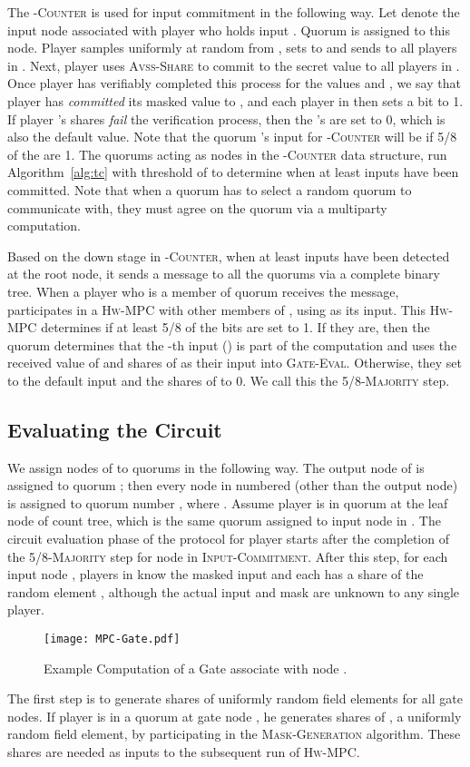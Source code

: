 \documentclass[10pt]{llncs}
\newcommand{\thresh}{5/8\xspace}
\newcommand{\done}{\xspace}
\newcommand{\vssSh}{\textsc{Avss-Share}\xspace}
\newcommand{\hw}{\textsc{Hw-MPC}\xspace}
\newcommand{\tc}{\textsc{-Counter}\xspace}
\newcommand{\ic}{\textsc{Input-Commitment}\xspace}
\newcommand{\gm}{\textsc{Mask-Generation}\xspace}
\newcommand{\gcomp}{\textsc{Gate-Eval}\xspace}
\newcommand{\maj}{\thresh-\textsc{Majority}\xspace}
\newcommand{\ct}{count tree\xspace}
\begin{document}
The \tc is used for input commitment in the following way.
Let  denote the input node associated with player  who holds input 
. Quorum  is assigned to this node. 
Player   samples   uniformly at random from ,
sets  to  and sends
 to all players in .  Next, player  uses \vssSh to 
commit to the secret value  to all
players in .  Once player  has verifiably completed this
process for the values  and , we say that player
 has \emph{committed} its masked value to , and each
player  in  then sets a bit  to 1. If player
's shares \emph{fail} the verification process, then the
's are set to 0, which is also the default value. 
Note that the quorum 's input for \tc will be  if \thresh 
of the 
 are 1. The
quorums acting as nodes in the \tc data structure, run Algorithm~\ref{alg:tc} 
with threshold of  to determine when at least
 inputs have been committed. Note that when a quorum has to select a 
random quorum to communicate with, they must agree on the quorum via a 
multiparty computation.

Based on the down stage in \tc, when at least  inputs have been
detected at the root node, it sends a \done message to all the quorums 
via a complete binary tree.
When a player  who is a member of quorum  receives the \done 
message,  participates
in a \hw with other members of , using  as its
input. This \hw determines if at least \thresh of the bits are set to
1. If they are, then the quorum determines that the -th input
() is part of the computation and uses the received value of
 and shares of  as their input into
\gcomp. Otherwise, they set  to the default input and the
shares of  to 0. We call this the \maj step.

\subsection{Evaluating the Circuit} \label{sec:compute}


We assign nodes of  to quorums in the following way. The output
node of  is assigned to quorum ; then every node in  numbered
 (other than the output node) is assigned to quorum number ,
where .  
Assume player  is in quorum 
at the leaf node  of \ct, which is the same quorum assigned to
input node  in . The circuit evaluation phase of the protocol
for player  starts after the completion of the \maj step for node
 in \ic. After this step, for each input node , players in 
know the masked input  and each has a share of the random
element , although the actual input and mask are unknown to
any single player.
\begin{figure}[t]
  \begin{center}
  \texttt{[image: MPC-Gate.pdf]}
  \end{center}
  \caption{Example Computation of a Gate associate with node .}
  \label{f:quorums}
  \end{figure} 
The first step is to generate shares of uniformly random field
elements for all gate nodes. If player  is in a quorum at gate node
, he generates shares of , a uniformly random field
element, by participating in the \gm algorithm. These shares are
needed as inputs to the subsequent run of \hw.
\end{document}

